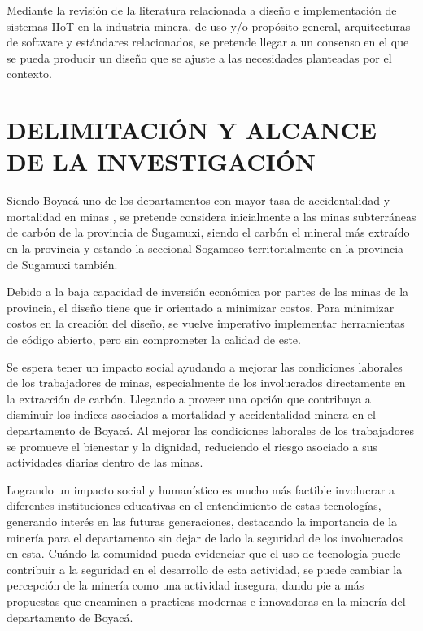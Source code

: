 \documentclass[stu,12pt,floatsintext]{apa7}
\begin{document}
		Mediante la revisión de la literatura relacionada a diseño e implementación de sistemas IIoT en la industria minera, de uso y/o propósito general, arquitecturas de software y estándares relacionados, se pretende llegar a un consenso en el que se pueda producir un diseño que se ajuste a las necesidades planteadas por el contexto.
		
	\section{DELIMITACIÓN Y ALCANCE DE LA INVESTIGACIÓN}
	Siendo Boyacá uno de los departamentos con mayor tasa de accidentalidad y mortalidad en minas \cite{anm2020}, se pretende considera inicialmente a las minas subterráneas de carbón de la provincia de Sugamuxi, siendo el carbón el mineral más extraído en la provincia y estando la seccional Sogamoso territorialmente en la provincia de Sugamuxi también.
	
	Debido a la baja capacidad de inversión económica por partes de las minas de la provincia, el diseño tiene que ir orientado a minimizar costos.
	Para minimizar costos en la creación del diseño, se vuelve imperativo implementar herramientas de código abierto, pero sin comprometer la calidad de este.
	
	Se espera tener un impacto social ayudando a mejorar las condiciones laborales de los trabajadores de minas, especialmente de los involucrados directamente en la extracción de carbón. Llegando a proveer una opción que contribuya a disminuir los indices asociados a mortalidad  y accidentalidad 	minera en el departamento de Boyacá.
	Al mejorar las condiciones laborales de los trabajadores se promueve el bienestar y la dignidad, reduciendo el riesgo asociado a sus actividades diarias dentro de las minas.
	
	Logrando un impacto social y humanístico es mucho más factible involucrar a diferentes instituciones educativas en el entendimiento de estas tecnologías, generando interés en las futuras generaciones, destacando la importancia de la minería para el departamento sin dejar de lado la seguridad de los involucrados en esta.
	Cuándo la comunidad pueda evidenciar que el uso de tecnología puede contribuir a la seguridad en el desarrollo de esta actividad, se puede cambiar la percepción de la minería como una actividad insegura, dando pie a más propuestas que encaminen a practicas modernas e innovadoras en la minería del departamento de Boyacá.
	
\end{document}
